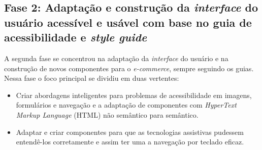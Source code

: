 \subsection{Fase 2: Adaptação e construção da \textit{interface} do usuário acessível e usável com base no guia de acessibilidade e \textit{style guide}}
{A segunda fase se concentrou na adaptação da \textit{interface} do usuário e na construção de novos componentes para o \textit{e-commerce}, sempre seguindo os guias. Nessa fase o foco principal se dividiu em duas vertentes:
\begin{itemize}
\item Criar abordagens inteligentes para problemas de acessibilidade em imagens, formulários e navegação e a adaptação de componentes com \textit{HyperText Markup Language} (HTML) \cite{flatschart2011html}  não semântico para semântico.
\item  Adaptar e criar componentes para que as tecnologias assistivas pudessem entendê-los corretamente e assim ter uma a navegação por teclado eficaz.

\end{itemize}
}
